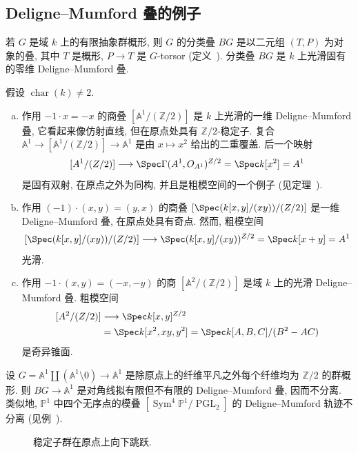 \subsection{Deligne--Mumford 叠的例子}\label{src:4.9.2-subsection}
\begin{example}[分类叠]\label{src:4.9.10}
若 $G$ 是域 $k$ 上的有限抽象群概形, 则 $G$ 的分类叠 $BG$ 是以二元组 $(T,P)$ 为对象的叠, 其中 $T$ 是概形, $P\to T$ 是 $G$-torsor (定义~). 分类叠 $BG$ 是 $k$ 上光滑固有的零维 Deligne--Mumford 叠.
\end{example}
\begin{example}[简单的例子]\label{src:4.9.11}
假设 $\operatorname{char}(k)\ne2$.
\begin{enumerate}[(a)]
\item 作用 $-1\cdot x=-x$ 的商叠 $[\mathbb A^1/(\mathbb Z/2)]$ 是 $k$ 上光滑的一维 Deligne--Mumford 叠, 它看起来像仿射直线, 但在原点处具有 $\mathbb Z/2$-稳定子. 复合 $\mathbb A^1\to[\mathbb A^1/(\mathbb Z/2)]\to\mathbb A^1$ 是由 $x\mapsto x^2$ 给出的二重覆盖. 后一个映射
\[
[\mathbb A^1/(\mathbb Z/2)]\longrightarrow
\Spec\Gamma(\mathbb A^1,\mathcal O_{\mathbb A^1})^{\mathbb Z/2}
=\Spec k[x^2]=\mathbb A^1
\]
是固有双射, 在原点之外为同构, 并且是粗模空间的一个例子 (见定理~).
\item 作用 $(-1)\cdot(x,y)=(y,x)$ 的商叠 $[\Spec(k[x,y]/(xy))/(\mathbb Z/2)]$ 是一维 Deligne--Mumford 叠, 在原点处具有奇点. 然而, 粗模空间
\[
[\Spec(k[x,y]/(xy))/(\mathbb Z/2)]\longrightarrow
\Spec(k[x,y]/(xy))^{\mathbb Z/2}=\Spec k[x+y]=\mathbb A^1
\]
光滑.
\item 作用 $-1\cdot(x,y)=(-x,-y)$ 的商 $[\mathbb A^2/(\mathbb Z/2)]$ 是域 $k$ 上的光滑 Deligne--Mumford 叠. 粗模空间
\[
\begin{aligned}
[\mathbb A^2/(\mathbb Z/2)]&\longrightarrow\Spec k[x,y]^{\mathbb Z/2}\\
&=\Spec k[x^2,xy,y^2]=\Spec k[A,B,C]/(B^2-AC)
\end{aligned}
\]
是奇异锥面.
\end{enumerate}
\end{example}
\begin{example}[拟有限但不有限的惯性]\label{src:4.9.12}
设 $G=\mathbb A^1\amalg(\mathbb A^1\setminus0)\to\mathbb A^1$ 是除原点上的纤维平凡之外每个纤维均为 $\mathbb Z/2$ 的群概形. 则 $BG\to\mathbb A^1$ 是对角线拟有限但不有限的 Deligne--Mumford 叠, 因而不分离. 类似地, $\mathbb P^1$ 中四个无序点的模叠 $[\operatorname{Sym}^4\mathbb P^1/\operatorname{PGL}_2]$ 的 Deligne--Mumford 轨迹不分离 (见例~).
\begin{figure}[H]
\centering
\caption{稳定子群在原点上向下跳跃.}\label{src:4.9.13}
\end{figure}
\end{example}
